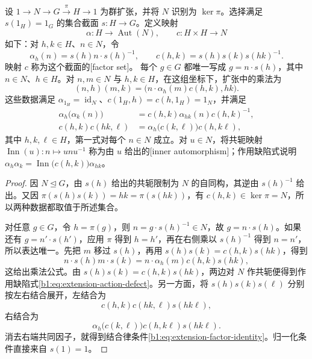 \begin{proposition}\label{b1:prop:extension-factor-data}
	设 \(1\rightarrow N\rightarrow G\xrightarrow{\pi}H\rightarrow1\) 为群扩张，并将 \(N\) 识别为 \(\ker\pi\)。选择满足 \(s(1_H)=1_G\) 的集合截面 \(s:H\rightarrow G\)。定义映射
	\[
		\alpha:H\longrightarrow\operatorname{Aut}(N),\qquad c:H\times H\longrightarrow N
	\]
	如下：对 \(h,k\in H\)、\(n\in N\)，令
	\[
		\alpha_h(n)=s(h)n\cdot s(h)^{-1},\qquad c(h,k)=s(h)s(k)s(hk)^{-1}.
	\]
	映射 \(c\) 称为这个截面的[factor set]。 每个 \(g\in G\) 都唯一写成 \(g=n\cdot s(h)\)，其中 \(n\in N\)、\(h\in H\)。对 \(n,m\in N\) 与 \(h,k\in H\)，在这组坐标下，扩张中的乘法为
	\[
		(n,h)(m,k)=\bigl(n\cdot\alpha_h(m)c(h,k),hk\bigr).
	\]
	这些数据满足 \(\alpha_{1_H}=\operatorname{id}_N\)、\(c(1_H,h)=c(h,1_H)=1_N\)，并满足
	\begin{align}
		\alpha_h\bigl(\alpha_k(n)\bigr) &=c(h,k)\alpha_{hk}(n)c(h,k)^{-1},\label{b1:eq:extension-action-defect}\\
		c(h,k)c(hk,\ell) &=\alpha_h\bigl(c(k,\ell)\bigr)c(h,k\ell),\label{b1:eq:extension-factor-identity}
	\end{align}
	其中 \(h,k,\ell\in H\)，第一式对每个 \(n\in N\) 成立。对 \(u\in N\)，将共轭映射 \(\operatorname{Inn}(u):n\mapsto unu^{-1}\) 称为由 \(u\) 给出的[inner automorphism]；作用缺陷式说明 \(\alpha_h\alpha_k=\operatorname{Inn}\bigl(c(h,k)\bigr)\alpha_{hk}\)。
\end{proposition}
\begin{proof}
	因 \(N\trianglelefteq G\)，由 \(s(h)\) 给出的共轭限制为 \(N\) 的自同构，其逆由 \(s(h)^{-1}\) 给出。又因 \(\pi(s(h)s(k))=hk=\pi(s(hk))\)，有 \(c(h,k)\in\ker\pi=N\)，所以两种数据都取值于所述集合。

	对任意 \(g\in G\)，令 \(h=\pi(g)\)，则 \(n=g\cdot s(h)^{-1}\in N\)，故 \(g=n\cdot s(h)\)。如果还有 \(g=n'\cdot s(h')\)，应用 \(\pi\) 得到 \(h=h'\)，再在右侧乘以 \(s(h)^{-1}\) 得到 \(n=n'\)，所以表达唯一。先把 \(m\) 移过 \(s(h)\)，再用 \(s(h)s(k)=c(h,k)s(hk)\)，得到
	\[
		n\cdot s(h)m\cdot s(k)=n\cdot\alpha_h(m)c(h,k)s(hk),
	\]
	这给出乘法公式。由 \(s(h)s(k)=c(h,k)s(hk)\)，两边对 \(N\) 作共轭便得到作用缺陷式\eqref{b1:eq:extension-action-defect}。另一方面，将 \(s(h)s(k)s(\ell)\) 分别按左右结合展开，左结合为
	\[
		c(h,k)c(hk,\ell)s(hk\ell),
	\]
	右结合为
	\[
		\alpha_h\bigl(c(k,\ell)\bigr)c(h,k\ell)s(hk\ell).
	\]
	消去右端共同因子，就得到结合律条件\eqref{b1:eq:extension-factor-identity}。归一化条件直接来自 \(s(1)=1\)。
\end{proof}

